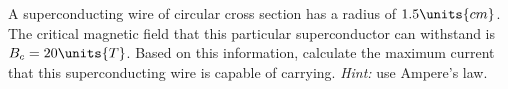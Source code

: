 \begin{problem}
A superconducting wire of circular cross section has a radius of
$1.5\units{cm}$.  The critical magnetic field that this particular
superconductor can withstand is $B_c=20\units{T}$.  Based on this
information, calculate the maximum current that this superconducting
wire is capable of carrying.  \textit{Hint:} use Ampere's law.
\end{problem}

%



